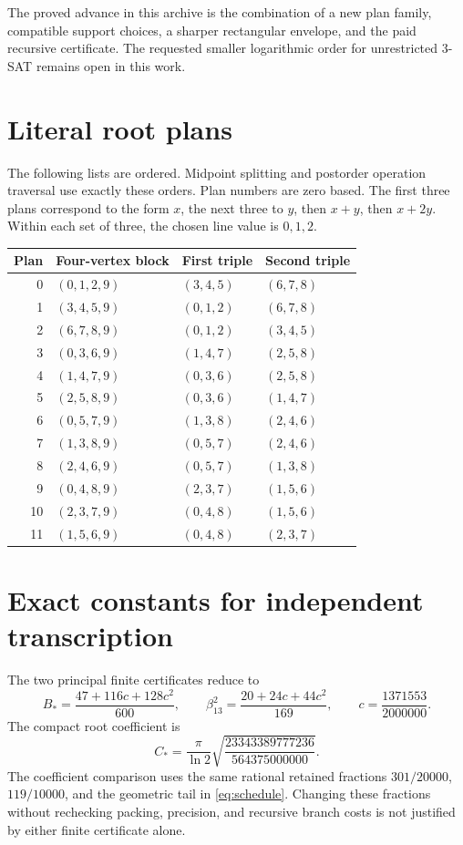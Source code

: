 The proved advance in this archive is the combination of a new plan
family, compatible support choices, a sharper rectangular envelope, and
the paid recursive certificate. The requested smaller logarithmic order
for unrestricted 3-SAT remains open in this work.

\appendix
\section{Literal root plans}\label{sec:plantable}

The following lists are ordered. Midpoint splitting and postorder
operation traversal use exactly these orders. Plan numbers are zero based.
The first three plans correspond to the form \(x\), the next three to
\(y\), then \(x+y\), then \(x+2y\). Within each set of three, the chosen
line value is \(0,1,2\).

\begin{center}
\begin{tabular}{@{}rlll@{}}
\toprule
Plan & Four-vertex block & First triple & Second triple\\
\midrule
0  & \((0,1,2,9)\) & \((3,4,5)\) & \((6,7,8)\)\\
1  & \((3,4,5,9)\) & \((0,1,2)\) & \((6,7,8)\)\\
2  & \((6,7,8,9)\) & \((0,1,2)\) & \((3,4,5)\)\\
3  & \((0,3,6,9)\) & \((1,4,7)\) & \((2,5,8)\)\\
4  & \((1,4,7,9)\) & \((0,3,6)\) & \((2,5,8)\)\\
5  & \((2,5,8,9)\) & \((0,3,6)\) & \((1,4,7)\)\\
6  & \((0,5,7,9)\) & \((1,3,8)\) & \((2,4,6)\)\\
7  & \((1,3,8,9)\) & \((0,5,7)\) & \((2,4,6)\)\\
8  & \((2,4,6,9)\) & \((0,5,7)\) & \((1,3,8)\)\\
9  & \((0,4,8,9)\) & \((2,3,7)\) & \((1,5,6)\)\\
10 & \((2,3,7,9)\) & \((0,4,8)\) & \((1,5,6)\)\\
11 & \((1,5,6,9)\) & \((0,4,8)\) & \((2,3,7)\)\\
\bottomrule
\end{tabular}
\end{center}

\section{Exact constants for independent transcription}

The two principal finite certificates reduce to
\[
 B_* =\frac{47+116c+128c^2}{600},\qquad
 \beta_{13}^2=\frac{20+24c+44c^2}{169},\qquad
 c=\frac{1371553}{2000000}.
\]
The compact root coefficient is
\[
 \boxed{C_* =\frac{\pi}{\ln2}
            \sqrt{\frac{23343389777236}{564375000000}}}.
\]
The coefficient comparison uses the same rational retained fractions
\(301/20000\), \(119/10000\), and the geometric tail in
\eqref{eq:schedule}. Changing these fractions without rechecking packing,
precision, and recursive branch costs is not justified by either finite
certificate alone.

